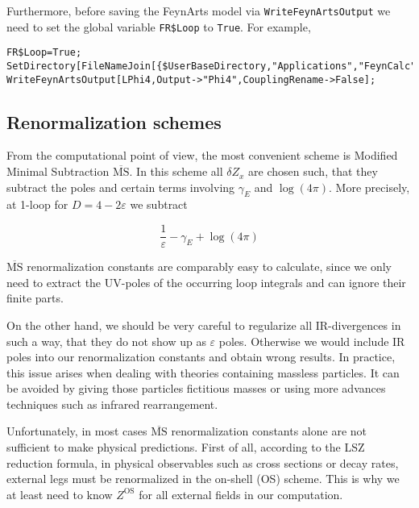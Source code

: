 \documentclass[../FeynCalcManual.tex]{subfiles}
\begin{document}
Furthermore, before saving the FeynArts model via
\texttt{WriteFeynArtsOutput} we need to set the global variable
\texttt{FR\$Loop} to \texttt{True}. For example,

\begin{verbatim}
FR$Loop=True;
SetDirectory[FileNameJoin[{$UserBaseDirectory,"Applications","FeynCalc","FeynArts","Models"}]];
WriteFeynArtsOutput[LPhi4,Output->"Phi4",CouplingRename->False];
\end{verbatim}

\hypertarget{renormalization-schemes}{%
\subsection{Renormalization schemes}\label{renormalization-schemes}}

From the computational point of view, the most convenient scheme is
Modified Minimal Subtraction \(\overline{\textrm{MS}}\). In this scheme
all \(\delta Z_x\) are chosen such, that they subtract the poles and
certain terms involving \(\gamma_E\) and \(\log(4\pi)\). More precisely,
at 1-loop for \(D= 4 - 2 \varepsilon\) we subtract

\begin{equation}
\frac{1}{\varepsilon} - \gamma_E + \log (4\pi)
\end{equation}

\(\overline{\textrm{MS}}\) renormalization constants are comparably easy
to calculate, since we only need to extract the UV-poles of the
occurring loop integrals and can ignore their finite parts.

On the other hand, we should be very careful to regularize all
IR-divergences in such a way, that they do not show up as
\(\varepsilon\) poles. Otherwise we would include IR poles into our
renormalization constants and obtain wrong results. In practice, this
issue arises when dealing with theories containing massless particles.
It can be avoided by giving those particles fictitious masses or using
more advances techniques such as infrared rearrangement.

Unfortunately, in most cases \(\overline{\textrm{MS}}\) renormalization
constants alone are not sufficient to make physical predictions. First
of all, according to the LSZ reduction formula, in physical observables
such as cross sections or decay rates, external legs must be
renormalized in the on-shell (OS) scheme. This is why we at least need
to know \(Z^{\textrm{OS}}\) for all external fields in our computation.
\end{document}
